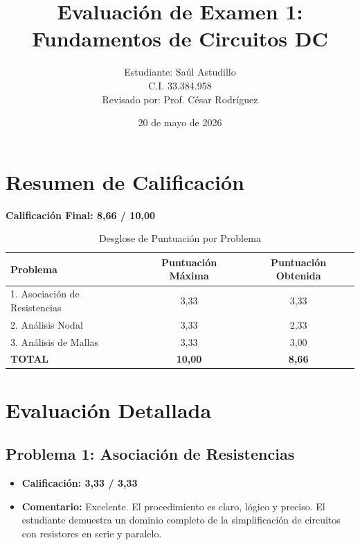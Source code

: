 \documentclass[12pt,a4paper]{article}
\title{Evaluación de Examen 1: Fundamentos de Circuitos DC}
\author{Estudiante: Saúl Astudillo \\ \small{C.I. 33.384.958} \\ \vspace{0.5cm} \large{Revisado por: Prof. César Rodríguez}}
\date{20 de mayo de 2026}
\begin{document}
\maketitle

\section*{Resumen de Calificación}

\begin{center}
    \huge \textbf{Calificación Final: 8,66 / 10,00}
\end{center}

\vspace{1cm}

\begin{table}[H]
    \centering
    \caption{Desglose de Puntuación por Problema}
    \label{tab:calificaciones}
    \begin{tabular}{@{}lcc@{}}
    \toprule
    \textbf{Problema} & \textbf{Puntuación Máxima} & \textbf{Puntuación Obtenida} \\
    \midrule
    1. Asociación de Resistencias & 3,33 & 3,33 \\
    2. Análisis Nodal & 3,33 & 2,33 \\
    3. Análisis de Mallas & 3,33 & 3,00 \\
    \midrule
    \textbf{TOTAL} & \textbf{10,00} & \textbf{8,66} \\
    \bottomrule
    \end{tabular}
\end{table}

\newpage

\section{Evaluación Detallada}

\subsection{Problema 1: Asociación de Resistencias}

\begin{itemize}
    \item \textbf{Calificación: 3,33 / 3,33}
    \item \textbf{Comentario:} Excelente. El procedimiento es claro, lógico y preciso. El estudiante demuestra un dominio completo de la simplificación de circuitos con resistores en serie y paralelo.
\end{itemize}
\end{document}
